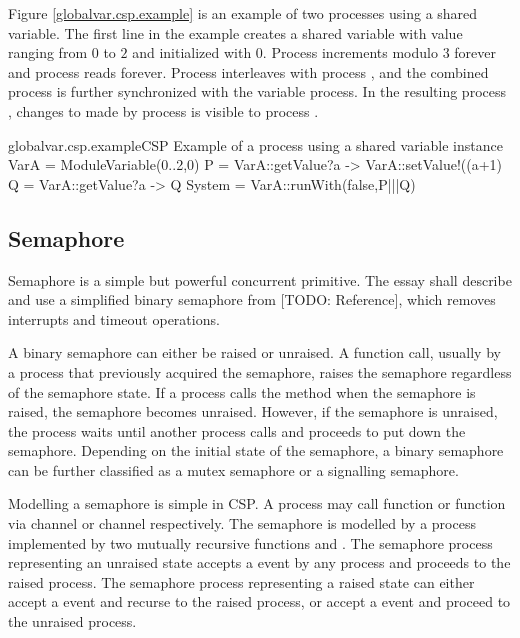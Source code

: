 \documentclass{article}
\begin{document}
Figure \ref{globalvar.csp.example} is an example of two processes using a shared variable. The first line in the example creates a shared variable  with value ranging from $0$ to $2$ and initialized with $0$. Process  increments  modulo $3$ forever and process  reads  forever. Process  interleaves with process , and the combined process is further synchronized with the variable  process. In the resulting process , changes to  made by process  is visible to process .

\begin{cspinline}{globalvar.csp.example}{CSP Example of a process using a shared variable}
instance VarA = ModuleVariable({0..2},0)
P = VarA::getValue?a -> VarA::setValue!((a+1)%
Q = VarA::getValue?a -> Q
System = VarA::runWith(false,P|||Q)
\end{cspinline}


\subsection{Semaphore}
Semaphore is a simple but powerful concurrent primitive. The essay shall describe and use a simplified binary semaphore from [TODO: Reference], which removes interrupts and timeout operations. 

A binary semaphore can either be raised or unraised. A  function call, usually by a process that previously acquired the semaphore, raises the semaphore regardless of the semaphore state. If a process calls the  method when the semaphore is raised, the semaphore becomes unraised. However, if the semaphore is unraised, the process waits until another process calls  and proceeds to put down the semaphore. Depending on the initial state of the semaphore, a binary semaphore can be further classified as a mutex semaphore or a signalling semaphore.

Modelling a semaphore is simple in CSP. A process may call  function or  function via channel  or channel  respectively. The semaphore is modelled by a process implemented by two mutually recursive functions  and . The semaphore process representing an unraised state accepts a  event by any process and proceeds to the raised process. The semaphore process representing a raised state can either accept a  event and recurse to the raised process, or accept a  event and proceed to the unraised process.
\end{document}

